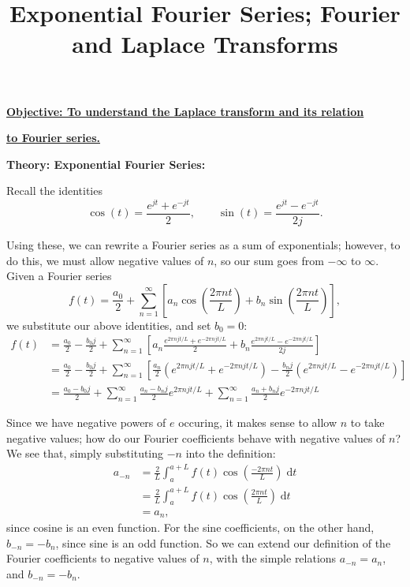 \documentclass{article}
\newcommand{\diff}{\;\mathrm{d}}
\begin{document}
\title{Exponential Fourier Series; Fourier and Laplace Transforms}
\date{}

\maketitle
\thispagestyle{empty}

\Large

\textbf{\underline{Objective: To understand the Laplace transform and its relation}}

\textbf{\underline{to Fourier series.}}






\vspace{5mm}

















\textbf{Theory: Exponential Fourier Series:}

\bigskip


Recall the identities
\[\cos(t)=\frac{e^{jt}+e^{-jt}}{2},\qquad \sin(t)=\frac{e^{jt}-e^{-jt}}{2j}.\]

Using these, we can rewrite a Fourier series as a sum of exponentials; however, to do this, we must allow negative values of $n$, so our sum goes from $-\infty$ to $\infty$. Given a Fourier series
\[f(t)=\frac{a_0}{2}+\sum_{n=1}^\infty \left[a_n\cos\left(\frac{2\pi nt}{L}\right) + b_n\sin\left(\frac{2\pi nt}{L}\right)\right],\]
we substitute our above identities, and set $b_0=0$:
\begin{align*}
	f(t) &= \frac{a_0}{2} - \frac{b_0j}{2} + \sum_{n=1}^\infty \left[a_n\frac{e^{2\pi njt/L}+e^{-2\pi njt/L}}{2} + b_n\frac{e^{2\pi njt/L}-e^{-2\pi njt/L}}{2j}\right]\\
	&= \frac{a_0}{2} -\frac{b_0j}{2}+ \sum_{n=1}^\infty \left[\frac{a_n}{2}\left(e^{2\pi njt/L}+e^{-2\pi njt/L}\right) - \frac{b_nj}{2}\left(e^{2\pi njt/L}-e^{-2\pi njt/L}\right)\right]\\
	&= \frac{a_0-b_0j}{2} + \sum_{n=1}^\infty \frac{a_n-b_nj}{2}e^{2\pi njt/L} + \sum_{n=1}^\infty \frac{a_n+b_nj}{2}e^{-2\pi njt/L}
\end{align*}

Since we have negative powers of $e$ occuring, it makes sense to allow $n$ to take negative values; how do our Fourier coefficients behave with negative values of $n$? We see that, simply substituting $-n$ into the definition:
\begin{align*}
	a_{-n} &= \frac{2}{L}\int_a^{a+L} f(t)\cos\left(\frac{-2\pi nt}{L}\right)\diff t\\
	&=\frac{2}{L}\int_a^{a+L} f(t)\cos\left(\frac{2\pi nt}{L}\right)\diff t\\
	&=a_n,
\end{align*}
since cosine is an even function. For the sine coefficients, on the other hand, $b_{-n}=-b_n$, since sine is an odd function. So we can extend our definition of the Fourier coefficients to negative values of $n$, with the simple relations $a_{-n}=a_n$, and $b_{-n}=-b_n$.
\end{document}
